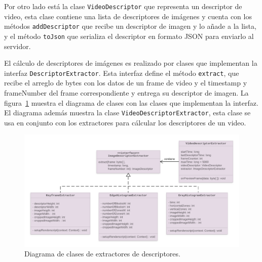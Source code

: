 Por otro lado está la clase \texttt{VideoDescriptor} que representa un descriptor de video, esta clase contiene una lista de descriptores de imágenes y cuenta con los métodos \texttt{addDescriptor} que recibe un descriptor de imagen y lo añade a la lista, y el método \texttt{toJson} que serializa el descriptor en formato JSON para enviarlo al servidor.


El cálculo de descriptores de imágenes es realizado por clases que implementan la interfaz \texttt{DescriptorExtractor}. Esta interfaz define el método \texttt{extract}, que recibe el arreglo de bytes con los datos de un frame de video y el timestamp y frameNumber del frame correspondiente y entrega su descriptor de imagen. La figura~\ref{diagrama_clases_extractores} muestra el diagrama de clases con las clases que implementan la interfaz. El diagrama además muestra la clase \texttt{VideoDescriptorExtractor}, esta clase se usa en conjunto con los extractores para cálcular los descriptores de un video.
	\begin{figure}[!h]
		\centering
		\includegraphics[scale=1.6]{imagenes/cap4/diagrama_clases_extractores.png}
		\caption{Diagrama de clases de extractores de descriptores.}
		\label{diagrama_clases_extractores}
	\end{figure}

